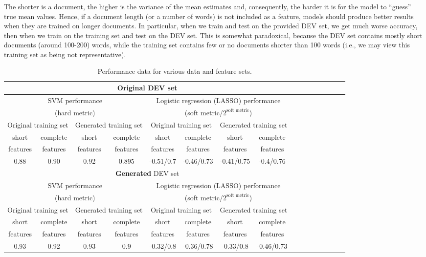 \documentclass[11pt]{article}
\begin{document}
The shorter is a document, the higher is the variance of the mean estimates
and, consequently, the harder it is for the model to ``guess'' true mean values.
Hence, if a document length (or a number of words)
is not included as a feature,
models should produce better results when they are trained on longer documents.
In particular, when we train and test on the provided DEV set, we get much worse
accuracy, then when we train on the training set and test on the DEV set.
This is somewhat paradoxical, because the DEV set contains mostly short documents (around 100-200)
words, while the training set contains few or no documents shorter than 100 words
(i.e., we may view this training set as being not representative).

\begin{table}
\caption{\label{TablePerf}  Performance data for various data and feature sets.}
\begin{tabular}{c|c|c|c|c|c|c|c|c|c|c|c|c|c|c|c}\hline
\multicolumn{8}{c}{\textbf{Original} DEV set} \\\hline\hline
\multicolumn{4}{c|}{SVM performance } & \multicolumn{4}{c}{Logistic regression (LASSO) performance } \\
\multicolumn{4}{c|}{(hard metric)} & \multicolumn{4}{c}{(soft metric/$2^{\mbox{soft metric}}$)} \\\hline\hline
\multicolumn{2}{c|}{Original training set} & \multicolumn{2}{c|}{Generated training set} 
&
\multicolumn{2}{c|}{Original training set} & \multicolumn{2}{c}{Generated training set} 
\\\hline
short & complete & short & complete  &
short & complete & short & complete  \\
features & features & features & features &
features & features & features & features \\\hline
0.88  & 0.90 & 0.92 &  0.895  & -0.51/0.7 & -0.46/0.73 & -0.41/0.75 & -0.4/0.76

\\\hline
\multicolumn{8}{c}{\textbf{Generated} DEV set} \\\hline\hline
\multicolumn{4}{c|}{SVM performance } & \multicolumn{4}{c}{Logistic regression (LASSO) performance } \\
\multicolumn{4}{c|}{(hard metric)} & \multicolumn{4}{c}{(soft metric/$2^{\mbox{soft metric}}$)} \\\hline\hline
\multicolumn{2}{c|}{Original training set} & \multicolumn{2}{c|}{Generated training set} &
\multicolumn{2}{c|}{Original training set} & \multicolumn{2}{c}{Generated training set} \\\hline
short & complete & short & complete  &
short & complete & short & complete  \\
features & features & features & features &
features & features & features & features \\\hline
0.93 & 0.92   & 0.93 & 0.9  & -0.32/0.8  & -0.36/0.78 & -0.33/0.8 & -0.46/0.73\\\hline
\end{tabular}
\end{table}
\end{document}
